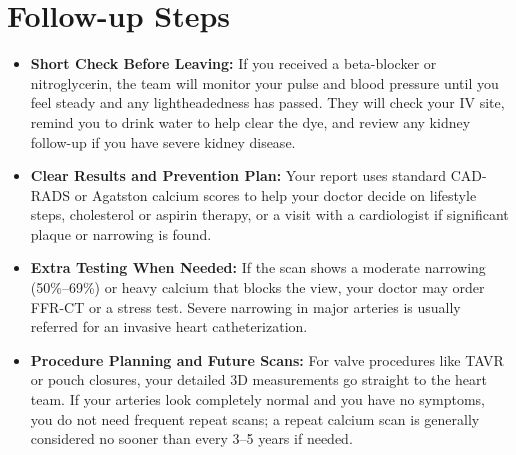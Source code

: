 \section{Follow-up Steps}
\begin{itemize}
    \item \textbf{Short Check Before Leaving:} If you received a beta-blocker or nitroglycerin, the team will monitor your pulse and blood pressure until you feel steady and any lightheadedness has passed. They will check your IV site, remind you to drink water to help clear the dye, and review any kidney follow-up if you have severe kidney disease.
    \item \textbf{Clear Results and Prevention Plan:} Your report uses standard CAD-RADS or Agatston calcium scores to help your doctor decide on lifestyle steps, cholesterol or aspirin therapy, or a visit with a cardiologist if significant plaque or narrowing is found.
    \item \textbf{Extra Testing When Needed:} If the scan shows a moderate narrowing (50\%--69\%) or heavy calcium that blocks the view, your doctor may order FFR-CT or a stress test. Severe narrowing in major arteries is usually referred for an invasive heart catheterization.
    \item \textbf{Procedure Planning and Future Scans:} For valve procedures like TAVR or pouch closures, your detailed 3D measurements go straight to the heart team. If your arteries look completely normal and you have no symptoms, you do not need frequent repeat scans; a repeat calcium scan is generally considered no sooner than every 3--5 years if needed.
\end{itemize}

